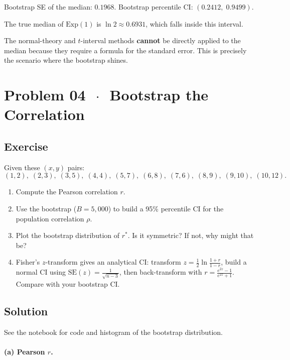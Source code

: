\documentclass[11pt]{article}
\begin{document}
Bootstrap SE of the median: $0.1968$. Bootstrap percentile CI: $(0.2412,\; 0.9499)$.

The true median of $\text{Exp}(1)$ is $\ln 2 \approx 0.6931$, which falls inside this interval.

The normal-theory and $t$-interval methods \textbf{cannot} be directly applied to the median because they require a formula for the standard error. This is precisely the scenario where the bootstrap shines.

\section*{Problem 04 \texorpdfstring{$\,\cdot\,$}{-} Bootstrap the Correlation}

\subsection*{Exercise}

Given these $(x, y)$ pairs:
\[
  (1,2),\; (2,3),\; (3,5),\; (4,4),\; (5,7),\; (6,8),\; (7,6),\; (8,9),\; (9,10),\; (10,12).
\]

\begin{enumerate}[label=\alph*)]
  \item Compute the Pearson correlation $r$.
  \item Use the bootstrap ($B = 5{,}000$) to build a 95\% percentile CI for the population correlation $\rho$.
  \item Plot the bootstrap distribution of $r^*$. Is it symmetric? If not, why might that be?
  \item Fisher's $z$-transform gives an analytical CI: transform $z = \tfrac{1}{2}\ln\tfrac{1+r}{1-r}$, build a normal CI using $\text{SE}(z) = \tfrac{1}{\sqrt{n-3}}$, then back-transform with $r = \tfrac{e^{2z}-1}{e^{2z}+1}$. Compare with your bootstrap CI.
\end{enumerate}

\subsection*{Solution}

See the notebook for code and histogram of the bootstrap distribution.

\paragraph{(a) Pearson $r$.}
\end{document}
